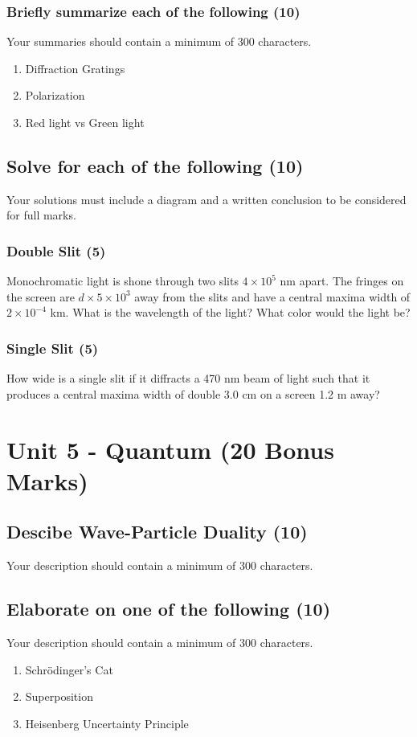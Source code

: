 \documentclass{article}
\begin{document}
\subsubsection{Briefly summarize each of the following (10)}
Your summaries should contain a minimum of 300 characters.
\begin{enumerate}[label=\alph*)]
    \item Diffraction Gratings
    \item Polarization
    \item Red light vs Green light
\end{enumerate}\leavevmode

\subsection{Solve for each of the following (10)}
Your solutions must include a diagram and a written conclusion to be considered for full marks.

\subsubsection{Double Slit (5)}
Monochromatic light is shone through two slits $4 \times 10^5$ nm apart. The fringes on the screen are $d \times 5 \times 10^3$ away from the slits and have a central maxima width of $2 \times 10^{-4}$ km. What is the wavelength of the light? What color would the light be?

\subsubsection{Single Slit (5)}
How wide is a single slit if it diffracts a 470 nm beam of light such that it produces a central maxima width of double 3.0 cm on a screen 1.2 m away?\\

\section{Unit 5 - Quantum (20 Bonus Marks)}
\subsection{Descibe Wave-Particle Duality (10)}
Your description should contain a minimum of 300 characters.

\subsection{Elaborate on one of the following (10)}
Your description should contain a minimum of 300 characters.
\begin{enumerate}[label=\alph*)]
    \item Schrödinger's Cat
    \item Superposition
    \item Heisenberg Uncertainty Principle
\end{enumerate}\leavevmode\\
\end{document}
